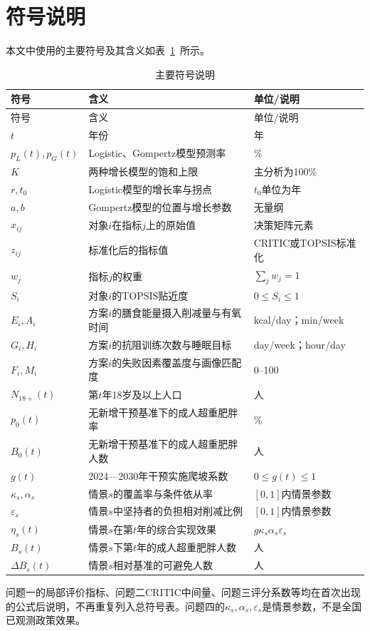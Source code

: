 \section{符号说明}

本文中使用的主要符号及其含义如表~\ref{tab:symbols}~所示。

\begingroup
\small
\setlength{\tabcolsep}{3pt}
\begin{longtable}{p{1.8cm}p{6.0cm}p{4.3cm}}
\caption{主要符号说明}\label{tab:symbols}\\
\toprule
符号 & 含义 & 单位/说明 \\
\midrule
\endfirsthead
\toprule
符号 & 含义 & 单位/说明 \\
\midrule
\endhead
$t$ & 年份 & 年 \\
$p_L(t),p_G(t)$ & Logistic、Gompertz模型预测率 & \% \\
$K$ & 两种增长模型的饱和上限 & 主分析为100\% \\
$r,t_0$ & Logistic模型的增长率与拐点 & $t_0$单位为年 \\
$a,b$ & Gompertz模型的位置与增长参数 & 无量纲 \\
\midrule
$x_{ij}$ & 对象$i$在指标$j$上的原始值 & 决策矩阵元素 \\
$z_{ij}$ & 标准化后的指标值 & CRITIC或TOPSIS标准化 \\
$w_j$ & 指标$j$的权重 & $\sum_jw_j=1$ \\
$S_i$ & 对象$i$的TOPSIS贴近度 & $0\leq S_i\leq1$ \\
$E_i,A_i$ & 方案$i$的膳食能量摄入削减量与有氧时间 & kcal/day；min/week \\
$G_i,H_i$ & 方案$i$的抗阻训练次数与睡眠目标 & day/week；hour/day \\
$F_i,M_i$ & 方案$i$的失败因素覆盖度与画像匹配度 & 0--100 \\
\midrule
$N_{18+}(t)$ & 第$t$年18岁及以上人口 & 人 \\
$p_0(t)$ & 无新增干预基准下的成人超重肥胖率 & \% \\
$B_0(t)$ & 无新增干预基准下的成人超重肥胖人数 & 人 \\
$g(t)$ & 2024---2030年干预实施爬坡系数 & $0\leq g(t)\leq1$ \\
$\kappa_s,\alpha_s$ & 情景$s$的覆盖率与条件依从率 & $[0,1]$内情景参数 \\
$\varepsilon_s$ & 情景$s$中坚持者的负担相对削减比例 & $[0,1]$内情景参数 \\
$\eta_s(t)$ & 情景$s$在第$t$年的综合实现效果 & $g\kappa_s\alpha_s\varepsilon_s$ \\
$B_s(t)$ & 情景$s$下第$t$年的成人超重肥胖人数 & 人 \\
$\Delta B_s(t)$ & 情景$s$相对基准的可避免人数 & 人 \\
\bottomrule
\end{longtable}
\endgroup

问题一的局部评价指标、问题二CRITIC中间量、问题三评分系数等均在首次出现的公式后说明，不再重复列入总符号表。问题四的$\kappa_s,\alpha_s,\varepsilon_s$是情景参数，不是全国已观测政策效果。

